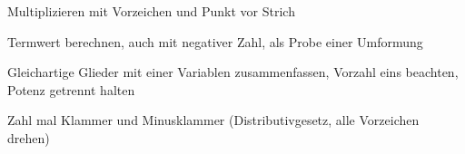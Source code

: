 \setcounter{aufgabe}{0}

\begin{aufgabe}{Multiplizieren mit Vorzeichen und Punkt vor Strich}
\end{aufgabe}

\begin{aufgabe}{Termwert berechnen, auch mit negativer Zahl, als Probe einer Umformung}
\end{aufgabe}

\begin{aufgabe}{Gleichartige Glieder mit einer Variablen zusammenfassen, Vorzahl eins beachten, Potenz getrennt halten}
\end{aufgabe}

\begin{aufgabe}{Zahl mal Klammer und Minusklammer (Distributivgesetz, alle Vorzeichen drehen)}
\end{aufgabe}

